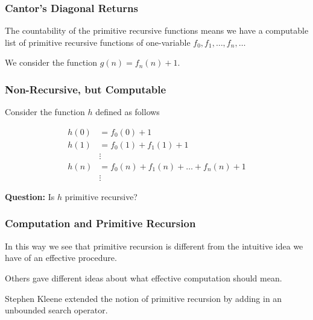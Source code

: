 \documentclass{beamer}
\theoremstyle{indentDefn} \newtheorem{defn}[]{Definition}
\begin{document}
\begin{frame}
	\frametitle{Cantor's Diagonal Returns}

	The countability of the primitive recursive functions means we have a computable list of primitive recursive functions of one-variable $f_{0}, f_{1}, \dots , f_{n}, \dots $

	\vspace{0.5cm}

	We consider the function $g(n) = f_{n}(n) + 1$. 

	\vspace{5cm}


\end{frame}

\begin{frame}
	\frametitle{Non-Recursive, but Computable}

	Consider the function $h$ defined as follows 

	\begin{align*}
		h(0) &= f_{0}(0) + 1 \\
		h(1) &= f_{0}(1) + f_{1}(1) + 1 \\
		&\vdots \\
		h(n) &= f_{0}(n) + f_{1}(n) + \dots + f_{n}(n) + 1 \\
		&\vdots
	\end{align*}

	{\bf Question:} Is $h$ primitive recursive? 

	\vspace{3cm}



\end{frame}

\begin{frame}
	\frametitle{Computation and Primitive Recursion}

	In this way we see that primitive recursion is different from the intuitive idea we have of an effective procedure. 

	\vspace{0.5cm}

	Others gave different ideas about what effective computation should mean. 

	\vspace{0.5cm}

	Stephen Kleene extended the notion of primitive recursion by adding in an unbounded search operator. 


\end{frame}
\end{document}
